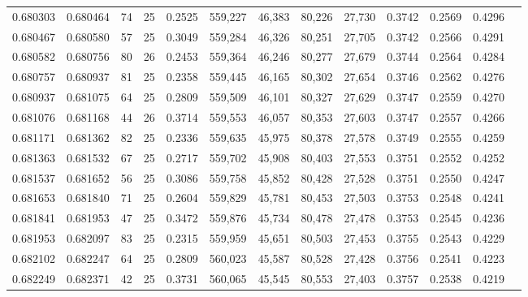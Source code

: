 \begin{tabular}{rrrrrrrrrrrrr}
0.680303 & 0.680464 &    74 &  25 &                                     0.2525 & 559,227 &  46,383 &  80,226 &  27,730 & 0.3742 & 0.2569 & 0.4296 \\
0.680467 & 0.680580 &    57 &  25 &                                     0.3049 & 559,284 &  46,326 &  80,251 &  27,705 & 0.3742 & 0.2566 & 0.4291 \\
0.680582 & 0.680756 &    80 &  26 &                                     0.2453 & 559,364 &  46,246 &  80,277 &  27,679 & 0.3744 & 0.2564 & 0.4284 \\
0.680757 & 0.680937 &    81 &  25 &                                     0.2358 & 559,445 &  46,165 &  80,302 &  27,654 & 0.3746 & 0.2562 & 0.4276 \\
0.680937 & 0.681075 &    64 &  25 &                                     0.2809 & 559,509 &  46,101 &  80,327 &  27,629 & 0.3747 & 0.2559 & 0.4270 \\
0.681076 & 0.681168 &    44 &  26 &                                     0.3714 & 559,553 &  46,057 &  80,353 &  27,603 & 0.3747 & 0.2557 & 0.4266 \\
0.681171 & 0.681362 &    82 &  25 &                                     0.2336 & 559,635 &  45,975 &  80,378 &  27,578 & 0.3749 & 0.2555 & 0.4259 \\
0.681363 & 0.681532 &    67 &  25 &                                     0.2717 & 559,702 &  45,908 &  80,403 &  27,553 & 0.3751 & 0.2552 & 0.4252 \\
0.681537 & 0.681652 &    56 &  25 &                                     0.3086 & 559,758 &  45,852 &  80,428 &  27,528 & 0.3751 & 0.2550 & 0.4247 \\
0.681653 & 0.681840 &    71 &  25 &                                     0.2604 & 559,829 &  45,781 &  80,453 &  27,503 & 0.3753 & 0.2548 & 0.4241 \\
0.681841 & 0.681953 &    47 &  25 &                                     0.3472 & 559,876 &  45,734 &  80,478 &  27,478 & 0.3753 & 0.2545 & 0.4236 \\
0.681953 & 0.682097 &    83 &  25 &                                     0.2315 & 559,959 &  45,651 &  80,503 &  27,453 & 0.3755 & 0.2543 & 0.4229 \\
0.682102 & 0.682247 &    64 &  25 &                                     0.2809 & 560,023 &  45,587 &  80,528 &  27,428 & 0.3756 & 0.2541 & 0.4223 \\
0.682249 & 0.682371 &    42 &  25 &                                     0.3731 & 560,065 &  45,545 &  80,553 &  27,403 & 0.3757 & 0.2538 & 0.4219 \\

\end{tabular}
